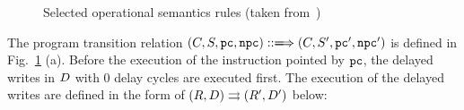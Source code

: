 \begin{figure}
	\caption{Selected operational semantics rules
		(taken from~\cite{sparc-formalization})}
	\label{Selected Operational Semantics}
\end{figure}
The program transition relation
$\LGlobTrans{(\code, \state, \pc, \npc)}
	{ \ \, }
	{(\code, \state', \pc', \npc')}$
is defined
in Fig.~\ref{Selected Operational Semantics} (a).
Before the execution of the instruction pointed by
$\texttt{pc}$, the delayed writes
in $D$ with $0$ delay cycles are executed first.
The execution of the delayed writes are defined in the
form of ${(R, D)}\rightrightarrows{(R', D')}$ below:

